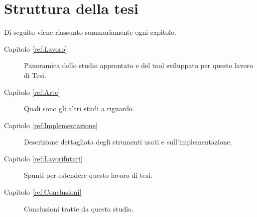 
\section{Struttura della tesi}

Di seguito viene riassunto sommariamente ogni capitolo.

\begin{description}
	\item[Capitolo \ref{ref:Lavoro}] Panoramica dello studio approntato e del tool sviluppato per questo lavoro di Tesi.

	\item[Capitolo \ref{ref:Arte}] Quali sono gli altri studi a riguardo.

	\item[Capitolo \ref{ref:Implementazione}] Descrizione dettagliata degli strumenti usati e sull'implementazione.
	
	\item[Capitolo \ref{ref:Lavorifuturi}] Spunti per estendere questo lavoro di tesi.

	\item[Capitolo \ref{ref:Conclusioni}] Conclusioni tratte da questo studio.

\end{description}